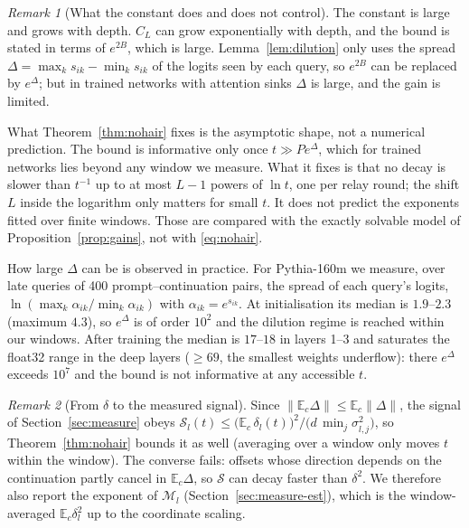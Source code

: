 \documentclass[11pt]{article}
\theoremstyle{definition}
\theoremstyle{remark}
\newtheorem{remark}{Remark}
\begin{document}
\begin{remark}[What the constant does and does not control]\label{rem:constant}
The constant is large and grows with depth. $C_L$ can grow exponentially with depth, and the bound is stated in terms of $e^{2B}$, which is large. Lemma~\ref{lem:dilution} only uses the spread $\Delta=\max_ks_{ik}-\min_ks_{ik}$ of the logits seen by each query, so $e^{2B}$ can be replaced by $e^{\Delta}$; but in trained networks with attention sinks $\Delta$ is large, and the gain is limited.

What Theorem~\ref{thm:nohair} fixes is the asymptotic shape, not a numerical prediction. The bound is informative only once $t\gg Pe^{\Delta}$, which for trained networks lies beyond any window we measure. What it fixes is that no decay is slower than $t^{-1}$ up to at most $L-1$ powers of $\ln t$, one per relay round; the shift $L$ inside the logarithm only matters for small $t$. It does not predict the exponents fitted over finite windows. Those are compared with the exactly solvable model of Proposition~\ref{prop:gains}, not with \eqref{eq:nohair}.

How large $\Delta$ can be is observed in practice. For Pythia-160m we measure, over late queries of 400 prompt--continuation pairs, the spread of each query's logits, $\ln(\max_k\alpha_{ik}/\min_k\alpha_{ik})$ with $\alpha_{ik}=e^{s_{ik}}$. At initialisation its median is $1.9$--$2.3$ (maximum $4.3$), so $e^{\Delta}$ is of order $10^2$ and the dilution regime is reached within our windows. After training the median is $17$--$18$ in layers 1--3 and saturates the float32 range in the deep layers ($\ge69$, the smallest weights underflow): there $e^{\Delta}$ exceeds $10^{7}$ and the bound is not informative at any accessible $t$.
\end{remark}
\begin{remark}[From $\delta$ to the measured signal]\label{rem:jensen}
Since $\|\mathbb E_c\Delta\|\le\mathbb E_c\|\Delta\|$, the signal of Section~\ref{sec:measure} obeys $\mathcal S_l(t)\le\big(\mathbb E_c\,\delta_l(t)\big)^2/\big(d\,\min_j\sigma_{l,j}^2\big)$, so Theorem~\ref{thm:nohair} bounds it as well (averaging over a window only moves $t$ within the window). The converse fails: offsets whose direction depends on the continuation partly cancel in $\mathbb E_c\Delta$, so $\mathcal S$ can decay faster than $\delta^2$. We therefore also report the exponent of $\mathcal M_l$ (Section~\ref{sec:measure-est}), which is the window-averaged $\mathbb E_c\delta_l^2$ up to the coordinate scaling.
\end{remark}
\end{document}
